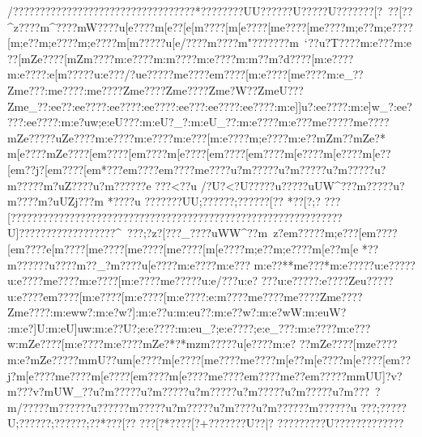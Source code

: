 {{{{{{{{{{{{{{{{{{{{{{{{{{{{{{{{{{{{{{{{{{{{{{{{{{{{{{{{{{{{{{{{{{{{{{{{{{{{{{{{{{{{{{{{{{{{{{{{{{{{{{{{{{{{{{{{{{{{{{{{{{{{{{{{{{{{{{{{{{{{{{{{{{{{{{{{{{{{{{{{{{{{{{{{{{{{{{{{{{{{{{{{{{{{{{{{{{{{{{{{{{{{{{{{{{{{{{{{{{{{{{{{{{{{{{{{{{{{{{{{{{{{{{{{{{{{{{{{{{{{{{{{{{{{{{{{{{{{{{{{{{{{{{{{{{{{{{{{{{{{{{{{{{{{{{{{{{{{{{{{{{{{{{{{{{{{{{{{{{{{{{{{{{{{{{{{{{{{{{{{{{{{{{{{{{{{{{{{{{{{{{{{{{{{{{{{{{{{{{{{{{{{{{{{{{{{{{{{{{{{{{{{{{{{{{{{{{{{{{{{{{{{{{{{{{{{{{{{{{{{{{{{{{{{{{{{{{{{{{{{{{{{{{{{{{{{{{{{{{{{{{{{{{{{{{{{{{{{{{{{{{{{{{{{{{{{{{{{{{{{{{{{{{{{{{{{{{{{{{{{{{{{{{{{{{{{{{{{{{{{{/??????????????????????????????????*????????UU??????U?????U??{??? ??[?~??[??^z????m^???}?mW????u[e????{m[e??[e[m????[m[e????[m{e????[m{e????{m;e??{m;e????[m;e??{m;e????{m;e????{m[m?????u[e/????}{m ????{m "????}? ??{m~`??u?T????{m:e???{m:e
??[mZe????[mZm????{m:e????{m:m????{m:e????{m:m??{m?d????[m:e????{m:e????:e[m?????u:e???/?ue?????me????e{m????[m:e????[me????m:e_??Zme???:me????:me????Zme????Zme????Zme?W??ZmeU???Zme_??:ee??:ee????:ee????:ee????:ee???:ee????:ee????:m:e]]u?:ee????:m:e]w_?:ee????:ee????:m:e?}uw;e:eU???:m:eU?_?:m:eU_??:m:e????m:e???me?????me????{mZe?????uZe????{m:e????{m:e????{m:e???[m:e????{m;e????{m:e??{mZm??{mZe?*
{m[e????{mZe????[e{m????[e{m????{m[e????[e{m????[e{m????{m[e????{m[e????{m[e??[e{m??j?[e{m????[e{m*???{e{m????{e{m????{m{e????u?m?????u?m?????u?m?????u?m?????m?uZ????u?m?????}?e
???<??u
/?U?}<?U?????u?????uUW^??}?m?????u?m ????m?uUZj??}?m
*????u
???????UU;??}????;??????[??
*??[?;? 
??{?[???????{???????{?????????????????????????????????????????   ????   ???U]??????????????    ????^~???;?z?[???_????uWW^??}{m~z?{e{m?????m;e???[e{m????[e{m????{e[m????[m{e????[m{e????[m{e????[m[e????{m;e??{m;e????{m[e??{m[e
*??}{m?????}?u???}?}{m ??_?}{m????u[e????{m:e????{m:e???
{m:e??**{me???*{m:e?????u:e?????u:e????{me????{m:e????[m:e????{me?????u:e/???u:e?
???u:e?????}:e????Ze{u?????u:e????e{m????[m:e????[m:e????[m:e????:e:m????{me????{me????Zme????Zme????:m:eww?:m:e?w?]:m:e??u:m:e}u??:m:e??w?:m:e?wW:m:euW?:m:e?]U:m:eU]uw:m:e??U?;e:e????:m:eu_}?;e:e????;e:e_???:m:e????m:e???w:mZe????[m:e????{m:e????{mZe?*?*{mzm?????u[e????{m:e? ??{mZe????[mze????{m:e? {mZe?????m{mU??u{m[e????{m[e????[m{e????{m{e????{m[e??{m[e????{m[e????[e{m??j?{m[e????{m{e????{m[e????[e{m????{m[e????{m{e????{e{m????{m{e??{e{m?????m{mUU]?v?m???v?mUW_??u?m?????u?m?????u?m?????u?m?????u?m?????u?m???~?m/?????m??????u?????}?m?????u?m?????u?m????u?m?????}?m??????u
???;??}???U;??????;??????;??*???[??
??{?[?*???{?[? +???{????U??|?
?????????U?????????????
}}}}}}}}}}}}}}}}}}}}}}}}}}}}}}}}}}}}}}}}}}}}}}}}}}}}}}}}}}}}}}}}}}}}}}}}}}}}}}}}}}}}}}}}}}}}}}}}}}}}}}}}}}}}}}}}}}}}}}}}}}}}}}}}}}}}}}}}}}}}}}}}}}}}}}}}}}}}}}}}}}}}}}}}}}}}}}}}}}}}}}}}}}}}}}}}}}}}}}}}}}}}}}}}}}}}}}}}}}}}}}}}}}}}}}}}}}}}}}}}}}}}}}}}}}}}}}}}}}}}}}}}}}}}}}}}}}}}}}}}}}}}}}}}}}}}}}}}}}}}}}}}}}}}}}}}}}}}}}}}}}}}}}}}}}}}}}}}}}}}}}}}}}}}}}}}}}}}}}}}}}}}}}}}}}}}}}}}}}}}}}}}}}}}}}}}}}}}}}}}}}}}}}}}}}}}}}}}}}}}}}}}}}}}}}}}}}}}}}}}}}}}}}}}}}}}}}}}}}}}}}}}}}}}}}}}}}}}}}}}}}}}}}}}}}}}}}}}}}}}}}}}}}}}}}}}}}}}}}}}}}}}}}}}}}}}}}}}}}}}}}}}}}}}}}}}}}}}}}}}}}}}}}}}}}}}}}}}}}}}}}}}}}}}}}}}}}}}}}}}}}}}}}}}}}}}}}}}}}}}}}}}}}}}}}}}}}}}}}}}}}}}}}}}}}}}}}}}}}}}}}}}}}}}}}}}}}
